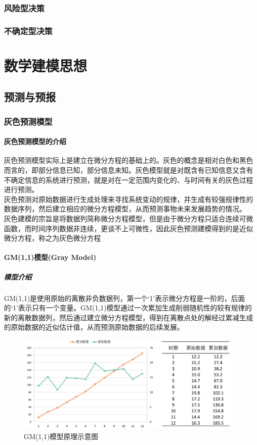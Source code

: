 \documentclass[openany]{progbookcn}
\begin{document}
\section{风险型决策}
\section{不确定型决策}
\part{数学建模思想}
\chapter{预测与预报}
\section{灰色预测模型}
\subsection{灰色预测模型的介绍}
\indent 灰色预测模型实际上是建立在微分方程的基础上的。灰色的概念是相对白色和黑色而言的，即部分信息已知，部分信息未知。灰色模型就是对既含有已知信息又含有不确定信息的系统进行预测，就是对在一定范围内变化的、与时间有关的灰色过程进行预测。\\
\indent 灰色预测对原始数据进行生成处理来寻找系统变动的规律，并生成有较强规律性的数据序列，然后建立相应的微分方程模型，从而预测事物未来发展趋势的情况。\\
\indent 灰色建模的宗旨是将数据列简称微分方程模型，但是由于微分方程只适合连续可微函数，而时间序列数据非连续，更谈不上可微性，因此灰色预测建模得到的是近似微分方程，称之为灰色微分方程
\subsection{GM(1,1)模型(Gray Model)}
\subsubsection{模型介绍}
\indent GM(1,1)是使用原始的离散非负数据列，第一个‘1’表示微分方程是一阶的，后面的‘1’表示只有一个变量。GM(1,1)模型通过一次累加生成削弱随机性的较有规律的新的离散数据列，然后通过建立微分方程模型，得到在离散点处的解经过累减生成的原始数据的近似估计值，从而预测原始数据的后续发展。
\begin{figure}[H]
\centering
\includegraphics[width=0.6 \textwidth]{figs/chapter8/GM11}
\caption{GM(1,1)模型原理示意图}
\end{figure}
\end{document}
